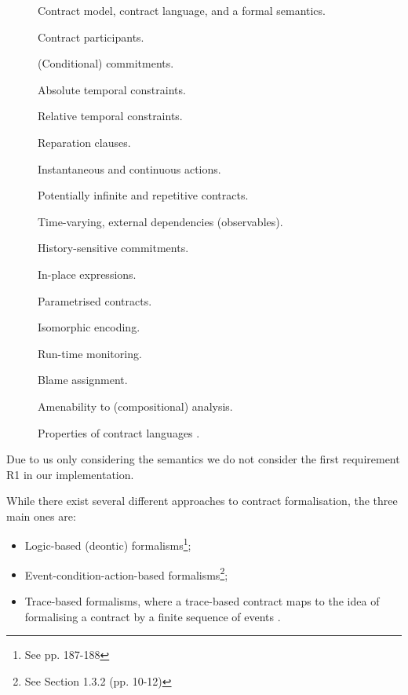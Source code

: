 \documentclass{ituthesis}
\begin{document}
\begin{figure}[!h]
\begin{tcolorbox}[fontupper=\small]
\begin{list}{R:~}{}
    \item Contract model, contract language, and a formal semantics.
    \item Contract participants.
    \item (Conditional) commitments.
    \item Absolute temporal constraints.
    \item Relative temporal constraints.
    \item Reparation clauses.
    \item Instantaneous and continuous actions.
    \item Potentially infinite and repetitive contracts.
    \item Time-varying, external dependencies (observables).
    \item History-sensitive commitments.
    \item In-place expressions.
    \item Parametrised contracts.
    \item Isomorphic encoding.
    \item Run-time monitoring.
    \item Blame assignment.
    \item Amenability to (compositional) analysis.
\end{list}
\end{tcolorbox}
\caption{Properties of contract languages \cite{hvitved2011contract}.}
\label{fig:properties}
\end{figure}

\newpage
Due to us only considering the semantics we do not consider the first requirement R1 in our implementation.

While there exist several different approaches to contract formalisation, the three main ones are:
\begin{itemize}
    \item Logic-based (deontic) formalisms\footnote{See \cite{hvitved2011contract} pp. 187-188};
    \item Event-condition-action-based formalisms\footnote{See \cite{hvitved2011contract} Section 1.3.2 (pp. 10-12)};
    \item Trace-based formalisms, where a trace-based contract maps to the idea of formalising a contract by a finite sequence of events \cite{andersen2006compositional}.
\end{itemize}
\end{document}
